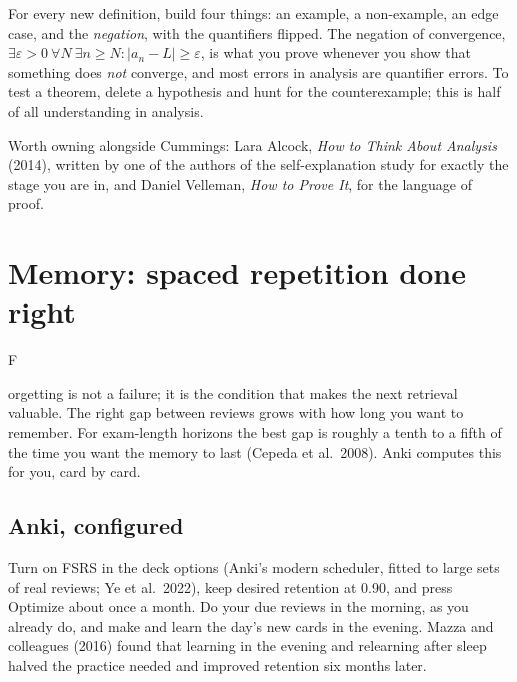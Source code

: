 \documentclass{kaelearn}
\begin{document}
For every new definition, build four things: an example, a non-example, an edge case, and the
\emph{negation}, with the quantifiers flipped. The negation of convergence,
$\exists\varepsilon>0\ \forall N\ \exists n\ge N: |a_n-L|\ge\varepsilon$, is what you prove whenever
you show that something does \emph{not} converge, and most errors in analysis are quantifier errors.
To test a theorem, delete a hypothesis and hunt for the counterexample; this is half of all
understanding in analysis.


Worth owning alongside Cummings: Lara Alcock, \emph{How to Think About Analysis} (2014), written by one
of the authors of the self-explanation study for exactly the stage you are in, and Daniel Velleman,
\emph{How to Prove It}, for the language of proof.

\section{Memory: spaced repetition done right}

\opening{F}{orgetting} is not a failure; it is the condition that makes the next retrieval valuable.
The right gap between reviews grows with how long you want to remember. For exam-length horizons the
best gap is roughly a tenth to a fifth of the time you want the memory to last (Cepeda et al.\ 2008).
Anki computes this for you, card by card.

\subsection{Anki, configured}
Turn on FSRS in the deck options (Anki's modern scheduler, fitted to large sets of real reviews;
Ye et al.\ 2022), keep desired retention at 0.90, and press Optimize about once a month. Do your due
reviews in the morning, as you already do, and make and learn the day's new cards in the evening. Mazza
and colleagues (2016) found that learning in the evening and relearning after sleep halved the practice
needed and improved retention six months later.
\end{document}
